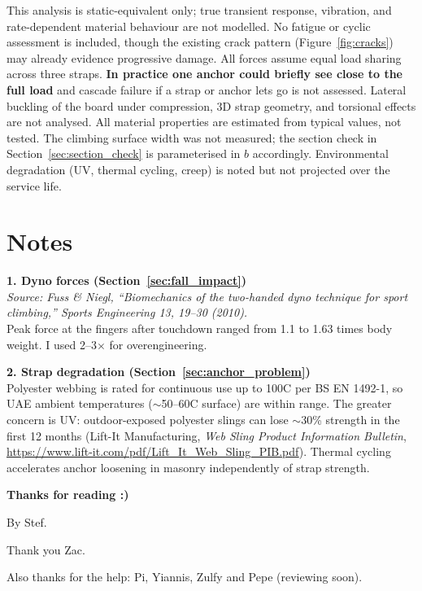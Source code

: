 \documentclass[12pt]{article}
\begin{document}
This analysis is static-equivalent only; true transient response, vibration, and rate-dependent material behaviour are not modelled. No fatigue or cyclic assessment is included, though the existing crack pattern (Figure~\ref{fig:cracks}) may already evidence progressive damage. All forces assume equal load sharing across three straps. \textbf{In practice one anchor could briefly see close to the full load} and cascade failure if a strap or anchor lets go is not assessed. Lateral buckling of the board under compression, 3D strap geometry, and torsional effects are not analysed. All material properties are estimated from typical values, not tested. The climbing surface width was not measured; the section check in Section~\ref{sec:section_check} is parameterised in $b$ accordingly. Environmental degradation (UV, thermal cycling, creep) is noted but not projected over the service life.
\section{Notes}
\label{sec:notes}

\noindent\textbf{1. Dyno forces (Section~\ref{sec:fall_impact})} \\[4pt]
\textit{Source: Fuss \& Niegl, ``Biomechanics of the two-handed dyno technique for sport climbing,'' Sports Engineering 13, 19--30 (2010).} \\[4pt]
Peak force at the fingers after touchdown ranged from 1.1 to 1.63 times body weight. I used 2--3$\times$ for overengineering.

\vspace{12pt}

\noindent\textbf{2. Strap degradation (Section~\ref{sec:anchor_problem})} \\[4pt]
Polyester webbing is rated for continuous use up to 100\textdegree C per BS EN 1492-1, so UAE ambient temperatures ($\sim$50--60\textdegree C surface) are within range. The greater concern is UV: outdoor-exposed polyester slings can lose $\sim$30\% strength in the first 12 months (Lift-It Manufacturing, \textit{Web Sling Product Information Bulletin}, \url{https://www.lift-it.com/pdf/Lift_It_Web_Sling_PIB.pdf}). Thermal cycling accelerates anchor loosening in masonry independently of strap strength.

\vspace{24pt}

\noindent\textbf{Thanks for reading :)}

\vspace{12pt}

\noindent By Stef.
\vspace{3pt}

\noindent Thank you Zac.

\noindent Also thanks for the help: Pi, Yiannis, Zulfy and Pepe (reviewing soon).
\end{document}
